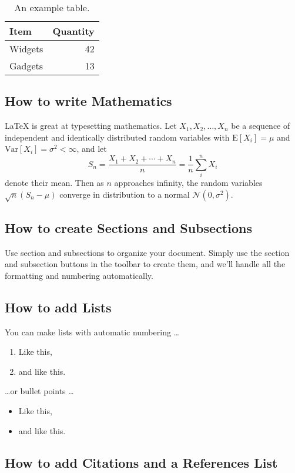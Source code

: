 \begin{table}
\centering
\begin{tabular}{l|r}
Item & Quantity \\\hline
Widgets & 42 \\
Gadgets & 13
\end{tabular}
\caption{\label{tab:widgets}An example table.}
\end{table}

\subsection{How to write Mathematics}

\LaTeX{} is great at typesetting mathematics. Let $X_1, X_2, \ldots, X_n$ be a sequence of independent and identically distributed random variables with $\text{E}[X_i] = \mu$ and $\text{Var}[X_i] = \sigma^2 < \infty$, and let
\[S_n = \frac{X_1 + X_2 + \cdots + X_n}{n}
      = \frac{1}{n}\sum_{i}^{n} X_i\]
denote their mean. Then as $n$ approaches infinity, the random variables $\sqrt{n}(S_n - \mu)$ converge in distribution to a normal $\mathcal{N}(0, \sigma^2)$.


\subsection{How to create Sections and Subsections}

Use section and subsections to organize your document. Simply use the section and subsection buttons in the toolbar to create them, and we'll handle all the formatting and numbering automatically.

\subsection{How to add Lists}

You can make lists with automatic numbering \dots

\begin{enumerate}
\item Like this,
\item and like this.
\end{enumerate}
\dots or bullet points \dots
\begin{itemize}
\item Like this,
\item and like this.
\end{itemize}

\subsection{How to add Citations and a References List}


